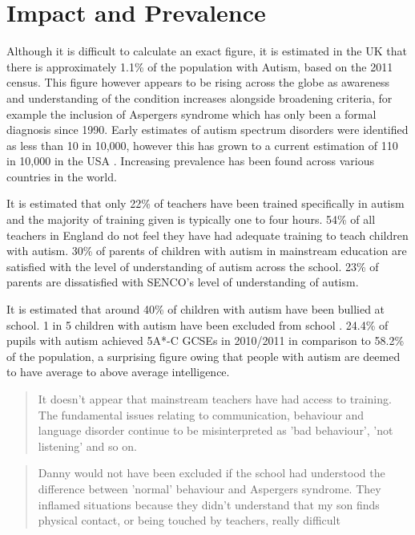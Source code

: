 \documentclass[11pt]{report}
\begin{document}
\section{Impact and Prevalence}
Although it is difficult to calculate an exact figure, it is estimated in the UK that there is approximately 1.1\% of the 
population with Autism, based on the 2011 census\cite{nas}. This figure however appears to be rising across the globe as awareness and understanding of the condition increases alongside broadening criteria\cite{increasingprevalence}, for example the inclusion of Aspergers syndrome which has only been a formal diagnosis since 1990. Early estimates of autism spectrum disorders were identified as less than 10 in 10,000, however this has grown to a current estimation of 110 in 10,000 in the USA \cite{increasingprevalence}. Increasing prevalence has been found across various countries in the world.


It is estimated that only 22\% of teachers have been trained specifically in autism and the majority of training given is typically one to four hours. 54\% of all teachers in England do not feel they have had adequate training to teach children with autism.\cite{statsandfacts} 30\% of parents of children with autism in mainstream education are satisfied with the level of understanding of autism across the school\cite{nasschool}. 23\% of parents are dissatisfied with SENCO's level of understanding of autism. 

It is estimated that around 40\% of children with autism have been bullied at school. 1 in 5 children with autism have been excluded from school \cite{nasschool}. 24.4\% of pupils with autism achieved 5A*-C GCSEs in 2010/2011 in comparison to 58.2\% of the population\cite{statsandfacts}, a surprising figure owing that people with autism are deemed to have average to above average intelligence\cite{findreference}.

\begin{quote}
It doesn't appear that mainstream teachers have had access to training. The fundamental issues relating to communication, behaviour and language disorder continue to be misinterpreted as 'bad behaviour', 'not listening' and so on.\cite{nasschool}
\end{quote}

\begin{quote}
Danny would not have been excluded if the school had understood the difference between 'normal' behaviour and Aspergers syndrome. They inflamed situations because they didn't understand that my son finds physical contact, or being touched by teachers, really difficult \cite{nasschool}
\end{quote}
\end{document}
